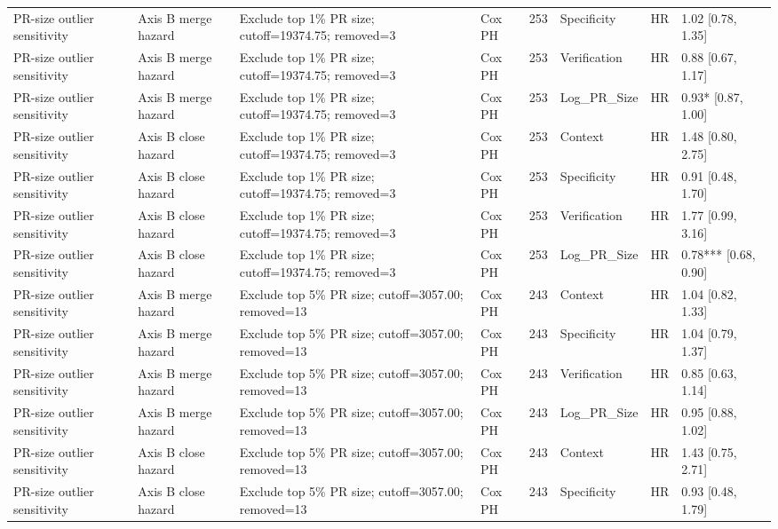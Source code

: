 \begin{table}
\begin{tabular}{llllrlll}
PR-size outlier sensitivity & Axis B merge hazard & Exclude top 1\% PR size; cutoff=19374.75; removed=3 & Cox PH & 253 & Specificity & HR & 1.02 [0.78, 1.35] \\
PR-size outlier sensitivity & Axis B merge hazard & Exclude top 1\% PR size; cutoff=19374.75; removed=3 & Cox PH & 253 & Verification & HR & 0.88 [0.67, 1.17] \\
PR-size outlier sensitivity & Axis B merge hazard & Exclude top 1\% PR size; cutoff=19374.75; removed=3 & Cox PH & 253 & Log\_PR\_Size & HR & 0.93* [0.87, 1.00] \\
PR-size outlier sensitivity & Axis B close hazard & Exclude top 1\% PR size; cutoff=19374.75; removed=3 & Cox PH & 253 & Context & HR & 1.48 [0.80, 2.75] \\
PR-size outlier sensitivity & Axis B close hazard & Exclude top 1\% PR size; cutoff=19374.75; removed=3 & Cox PH & 253 & Specificity & HR & 0.91 [0.48, 1.70] \\
PR-size outlier sensitivity & Axis B close hazard & Exclude top 1\% PR size; cutoff=19374.75; removed=3 & Cox PH & 253 & Verification & HR & 1.77 [0.99, 3.16] \\
PR-size outlier sensitivity & Axis B close hazard & Exclude top 1\% PR size; cutoff=19374.75; removed=3 & Cox PH & 253 & Log\_PR\_Size & HR & 0.78*** [0.68, 0.90] \\
PR-size outlier sensitivity & Axis B merge hazard & Exclude top 5\% PR size; cutoff=3057.00; removed=13 & Cox PH & 243 & Context & HR & 1.04 [0.82, 1.33] \\
PR-size outlier sensitivity & Axis B merge hazard & Exclude top 5\% PR size; cutoff=3057.00; removed=13 & Cox PH & 243 & Specificity & HR & 1.04 [0.79, 1.37] \\
PR-size outlier sensitivity & Axis B merge hazard & Exclude top 5\% PR size; cutoff=3057.00; removed=13 & Cox PH & 243 & Verification & HR & 0.85 [0.63, 1.14] \\
PR-size outlier sensitivity & Axis B merge hazard & Exclude top 5\% PR size; cutoff=3057.00; removed=13 & Cox PH & 243 & Log\_PR\_Size & HR & 0.95 [0.88, 1.02] \\
PR-size outlier sensitivity & Axis B close hazard & Exclude top 5\% PR size; cutoff=3057.00; removed=13 & Cox PH & 243 & Context & HR & 1.43 [0.75, 2.71] \\
PR-size outlier sensitivity & Axis B close hazard & Exclude top 5\% PR size; cutoff=3057.00; removed=13 & Cox PH & 243 & Specificity & HR & 0.93 [0.48, 1.79] \\

\end{tabular}
\end{table}
